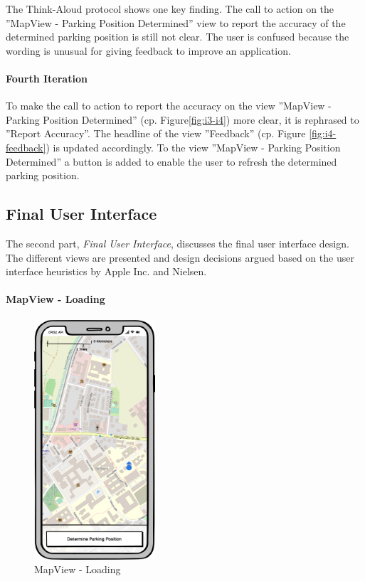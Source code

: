 The Think-Aloud protocol shows one key finding. The call to action on the ''MapView - Parking Position Determined'' view to report the accuracy of the determined parking position is still not clear. The user is confused because the wording is unusual for giving feedback to improve an application.

\paragraph{Fourth Iteration}

To make the call to action to report the accuracy on the view ''MapView - Parking Position Determined'' (cp. Figure\ref{fig:i3-i4}) more clear, it is rephrased to ''Report Accuracy''. The headline of the view ''Feedback'' (cp. Figure \ref{fig:i4-feedback}) is updated accordingly. To the view ''MapView - Parking Position Determined'' a button is added to enable the user to refresh the determined parking position. 

\subsection{Final User Interface}

The second part, \textit{Final User Interface}, discusses the final user interface design. The different views are presented and design decisions argued based on the user interface heuristics by Apple Inc. and Nielsen. \cite{nielsen1994usability} \cite{apple:interfaceguidliines}

\paragraph{MapView - Loading}

\begin{figure}[h]
    \centering
    \includegraphics[width=0.4\textwidth]{images/UI/Iteration4-MapView-Loading.png}
    \caption{MapView - Loading}
    \label{fig:mv-loading}
\end{figure}

